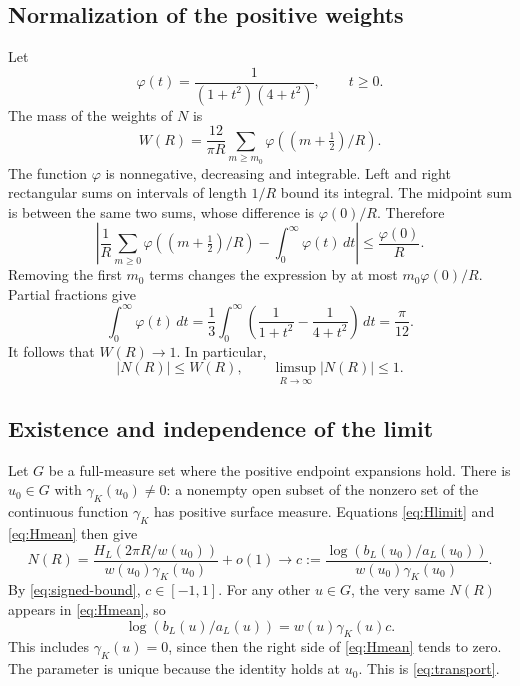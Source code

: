 \documentclass[11pt,a4paper]{article}
\theoremstyle{definition}
\theoremstyle{remark}
\numberwithin{equation}{section}
\begin{document}
\subsection{Normalization of the positive weights}
Let
\[
 \varphi(t)=\frac1{(1+t^2)(4+t^2)},\qquad t\ge0.
\]
The mass of the weights of $N$ is
\begin{equation}\label{eq:mass}
 W(R)=\frac{12}{\pi R}
           \sum_{m\ge m_0}\varphi((m+\tfrac12)/R).
\end{equation}
The function $\varphi$ is nonnegative, decreasing and integrable.
Left and right rectangular sums on intervals of length $1/R$
bound its integral. The midpoint sum is between the same two sums,
whose difference is $\varphi(0)/R$. Therefore
\[
 \left|\frac1R\sum_{m\ge0}\varphi((m+\tfrac12)/R)
             -\int_0^\infty\varphi(t)\,dt\right|
 \le\frac{\varphi(0)}R .
\]
Removing the first $m_0$ terms changes the expression by at most
$m_0\varphi(0)/R$. Partial fractions give
\[
 \int_0^\infty\varphi(t)\,dt
 =\frac13\int_0^\infty
       \left(\frac1{1+t^2}-\frac1{4+t^2}\right)\,dt
 =\frac{\pi}{12}.
\]
It follows that $W(R)\to1$. In particular,
\begin{equation}\label{eq:signed-bound}
 |N(R)|\le W(R),\qquad \limsup_{R\to\infty}|N(R)|\le1 .
\end{equation}

\subsection{Existence and independence of the limit}
Let $G$ be a full-measure set where the positive endpoint expansions hold.
There is $u_0\in G$ with $\gamma_K(u_0)\ne0$: a nonempty open subset of
the nonzero set of the continuous function $\gamma_K$ has positive
surface measure. Equations \eqref{eq:Hlimit} and \eqref{eq:Hmean} then give
\[
 N(R)=\frac{H_L(2\pi R/w(u_0))}{w(u_0)\gamma_K(u_0)}+o(1)
 \longrightarrow
 c:=\frac{\log(b_L(u_0)/a_L(u_0))}
          {w(u_0)\gamma_K(u_0)} .
\]
By \eqref{eq:signed-bound}, $c\in[-1,1]$.
For any other $u\in G$, the very same $N(R)$ appears in
\eqref{eq:Hmean}, so
\[
 \log(b_L(u)/a_L(u))=w(u)\gamma_K(u)c.
\]
This includes $\gamma_K(u)=0$, since then the right side of
\eqref{eq:Hmean} tends to zero. The parameter is unique because the
identity holds at $u_0$. This is \eqref{eq:transport}.
\end{document}
